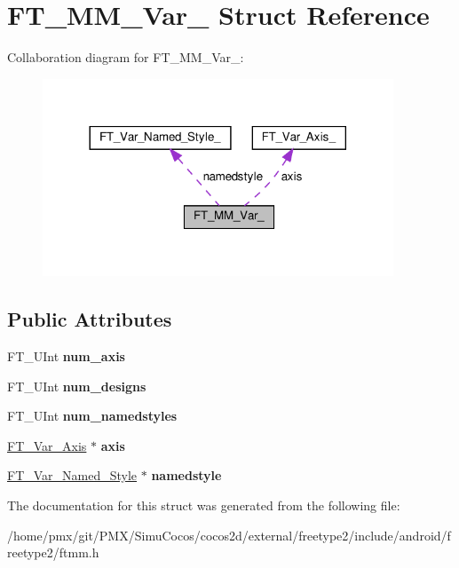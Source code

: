 \hypertarget{structFT__MM__Var__}{}\section{F\+T\+\_\+\+M\+M\+\_\+\+Var\+\_\+ Struct Reference}
\label{structFT__MM__Var__}


Collaboration diagram for F\+T\+\_\+\+M\+M\+\_\+\+Var\+\_\+\+:
\nopagebreak
\begin{figure}[H]
\begin{center}
\leavevmode
\includegraphics[width=296pt]{structFT__MM__Var____coll__graph}
\end{center}
\end{figure}
\subsection*{Public Attributes}
\begin{DoxyCompactItemize}
\item 
\mbox{\label{structFT__MM__Var___acd32d4eb128f6fd9f6fde7da4c7b99bf}} 
F\+T\+\_\+\+U\+Int {\bfseries num\+\_\+axis}
\item 
\mbox{\label{structFT__MM__Var___a5109a6a20626d90ed44cd64363d29e92}} 
F\+T\+\_\+\+U\+Int {\bfseries num\+\_\+designs}
\item 
\mbox{\label{structFT__MM__Var___ac54bdd53447f4967b5d3b1a341a4bdff}} 
F\+T\+\_\+\+U\+Int {\bfseries num\+\_\+namedstyles}
\item 
\mbox{\label{structFT__MM__Var___a6c441e03f74bc4e8795c3706da73d5d7}} 
\hyperlink{structFT__Var__Axis__}{F\+T\+\_\+\+Var\+\_\+\+Axis} $\ast$ {\bfseries axis}
\item 
\mbox{\label{structFT__MM__Var___aa119e2c56f43afcf7c73347b3333548b}} 
\hyperlink{structFT__Var__Named__Style__}{F\+T\+\_\+\+Var\+\_\+\+Named\+\_\+\+Style} $\ast$ {\bfseries namedstyle}
\end{DoxyCompactItemize}


The documentation for this struct was generated from the following file\+:\begin{DoxyCompactItemize}
\item 
/home/pmx/git/\+P\+M\+X/\+Simu\+Cocos/cocos2d/external/freetype2/include/android/freetype2/ftmm.\+h\end{DoxyCompactItemize}
